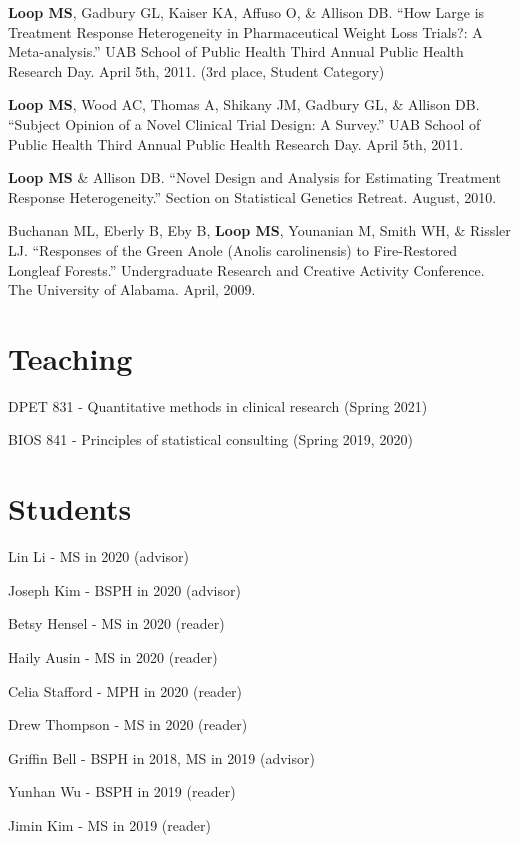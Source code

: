 \documentclass[10pt,letterpaper]{article}
\renewenvironment{itemize}{
  \begin{list}{}{
    \setlength{\leftmargin}{1.5em}
    \setlength{\itemsep}{0.25em}
    \setlength{\parskip}{0pt}
    \setlength{\parsep}{0.25em}
  }
}{
  \end{list}
}
\begin{document}
\begin{itemize}
	\item \textbf{Loop MS}, Gadbury GL, Kaiser KA, Affuso O, \& Allison DB. ``How Large is Treatment Response Heterogeneity in Pharmaceutical Weight Loss Trials?: A Meta-analysis.'' UAB 		School of Public Health Third Annual Public Health Research Day. April 5th, 2011. (3rd place, Student Category)
	\item \textbf{Loop MS}, Wood AC, Thomas A, Shikany JM, Gadbury GL, \& Allison DB. ``Subject Opinion of a Novel Clinical Trial Design: A Survey.'' UAB School of Public Health Third Annual Public Health Research Day. April 5th, 2011.
	\item \textbf{Loop MS} \& Allison DB. ``Novel Design and Analysis for Estimating Treatment Response Heterogeneity.'' Section on Statistical Genetics Retreat. August, 2010.
	\item Buchanan ML, Eberly B, Eby B, \textbf{Loop MS}, Younanian M, Smith WH, \& Rissler LJ. 	``Responses of the Green Anole (Anolis carolinensis) to Fire-Restored Longleaf Forests.'' Undergraduate Research and Creative Activity Conference. The University of 		Alabama. April, 2009.
\end{itemize}

\section*{Teaching}

\begin{itemize}
  \item DPET 831 - Quantitative methods in clinical research (Spring 2021)
    \item BIOS 841 - Principles of statistical consulting (Spring 2019, 2020)
\end{itemize}

\section*{Students}

\begin{itemize}
    \item Lin Li - MS in 2020 (advisor)
    \item Joseph Kim - BSPH in 2020 (advisor)
    \item Betsy Hensel - MS in 2020 (reader)
    \item Haily Ausin - MS in 2020 (reader)
    \item Celia Stafford - MPH in 2020 (reader)
    \item Drew Thompson - MS in 2020 (reader)
    \item Griffin Bell - BSPH in 2018, MS in 2019 (advisor)
    \item Yunhan Wu - BSPH in 2019 (reader)
    \item Jimin Kim - MS in 2019 (reader)
\end{itemize}
\end{document}
